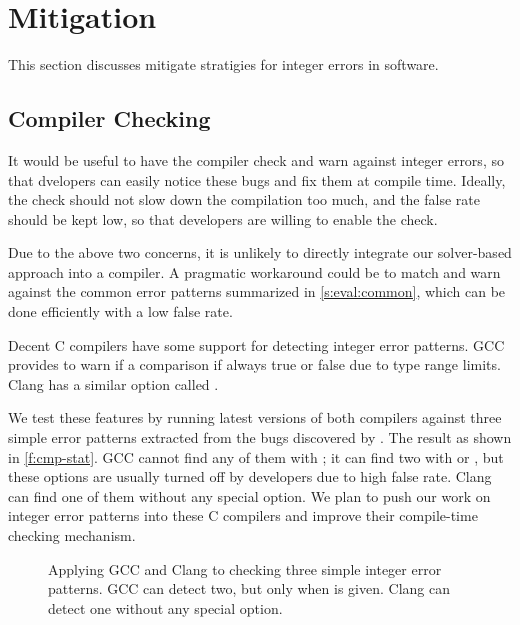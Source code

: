 \section{Mitigation}
\label{s:miti}

This section discusses mitigate stratigies for integer errors in
software.

\subsection{Compiler Checking}

It would be useful to have the compiler check and warn against
integer errors, so that dvelopers can easily notice these bugs and
fix them at compile time.  Ideally, the check should not slow down
the compilation too much, and the false rate should be kept low,
so that developers are willing to enable the check.

Due to the above two concerns, it is unlikely to directly integrate
our solver-based approach into a compiler.  A pragmatic workaround
could be to match and warn against the common error patterns
summarized in \autoref{s:eval:common}, which can be done efficiently
with a low false rate.

Decent C compilers have some support for detecting integer error
patterns.
%
GCC provides  to warn if a comparison if always
true or false due to type range limits.
%
Clang has a similar option called .

We test these features by running latest versions of both compilers
against three simple error patterns extracted from the bugs discovered
by \sys.  The result as shown in \autoref{f:cmp-stat}.  GCC cannot
find any of them with ; it can find two with 
or , but these options are usually turned off by
developers due to high false rate.  Clang can find one of them
without any special option.
%
%
We plan to push our work on integer error patterns into these C
compilers and improve their compile-time checking mechanism.

\begin{figure}
\centering

\caption{Applying GCC and Clang to checking three simple integer
error patterns.  GCC can detect two, but only when  is
given.  Clang can detect one without any special option.}
\label{f:cmp-stat}
\end{figure}

